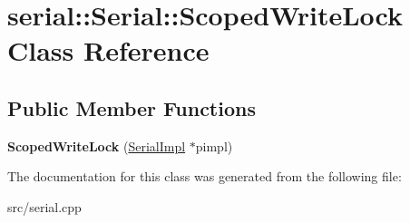 \hypertarget{classserial_1_1_serial_1_1_scoped_write_lock}{}\section{serial\+:\+:Serial\+:\+:Scoped\+Write\+Lock Class Reference}
\label{classserial_1_1_serial_1_1_scoped_write_lock}
\subsection*{Public Member Functions}
\begin{DoxyCompactItemize}
\item 
{\bfseries Scoped\+Write\+Lock} (\hyperlink{classserial_1_1serial_1_1_serial_1_1_serial_impl}{Serial\+Impl} $\ast$pimpl)\hypertarget{classserial_1_1_serial_1_1_scoped_write_lock_a662173968431aee3d6f204c354b20225}{}\label{classserial_1_1_serial_1_1_scoped_write_lock_a662173968431aee3d6f204c354b20225}

\end{DoxyCompactItemize}


The documentation for this class was generated from the following file\+:\begin{DoxyCompactItemize}
\item 
src/serial.\+cpp\end{DoxyCompactItemize}
